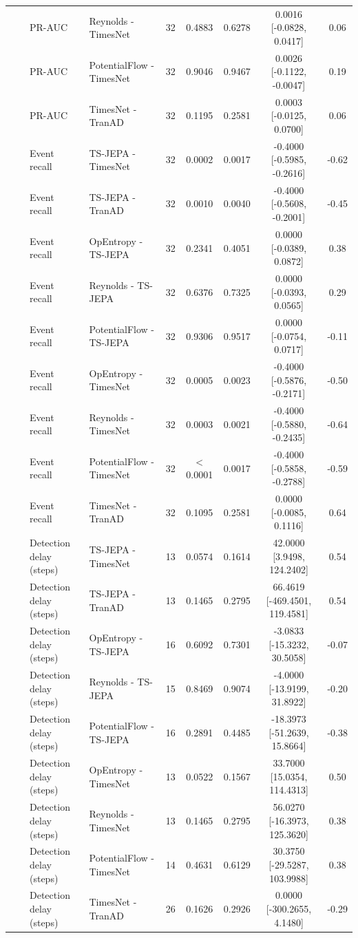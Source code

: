 {\begin{longtable}{@{}llllccccc@{}}
 &  & PR-AUC & Reynolds - TimesNet & 32 & 0.4883 & 0.6278 & 0.0016 [-0.0828, 0.0417] & 0.06 \\
 &  & PR-AUC & PotentialFlow - TimesNet & 32 & 0.9046 & 0.9467 & 0.0026 [-0.1122, -0.0047] & 0.19 \\
 &  & PR-AUC & TimesNet - TranAD & 32 & 0.1195 & 0.2581 & 0.0003 [-0.0125, 0.0700] & 0.06 \\
 &  & Event recall & TS-JEPA - TimesNet & 32 & 0.0002 & 0.0017 & -0.4000 [-0.5985, -0.2616] & -0.62 \\
 &  & Event recall & TS-JEPA - TranAD & 32 & 0.0010 & 0.0040 & -0.4000 [-0.5608, -0.2001] & -0.45 \\
 &  & Event recall & OpEntropy - TS-JEPA & 32 & 0.2341 & 0.4051 & 0.0000 [-0.0389, 0.0872] & 0.38 \\
 &  & Event recall & Reynolds - TS-JEPA & 32 & 0.6376 & 0.7325 & 0.0000 [-0.0393, 0.0565] & 0.29 \\
 &  & Event recall & PotentialFlow - TS-JEPA & 32 & 0.9306 & 0.9517 & 0.0000 [-0.0754, 0.0717] & -0.11 \\
 &  & Event recall & OpEntropy - TimesNet & 32 & 0.0005 & 0.0023 & -0.4000 [-0.5876, -0.2171] & -0.50 \\
 &  & Event recall & Reynolds - TimesNet & 32 & 0.0003 & 0.0021 & -0.4000 [-0.5880, -0.2435] & -0.64 \\
 &  & Event recall & PotentialFlow - TimesNet & 32 & $<$0.0001 & 0.0017 & -0.4000 [-0.5858, -0.2788] & -0.59 \\
 &  & Event recall & TimesNet - TranAD & 32 & 0.1095 & 0.2581 & 0.0000 [-0.0085, 0.1116] & 0.64 \\
 &  & Detection delay (steps) & TS-JEPA - TimesNet & 13 & 0.0574 & 0.1614 & 42.0000 [3.9498, 124.2402] & 0.54 \\
 &  & Detection delay (steps) & TS-JEPA - TranAD & 13 & 0.1465 & 0.2795 & 66.4619 [-469.4501, 119.4581] & 0.54 \\
 &  & Detection delay (steps) & OpEntropy - TS-JEPA & 16 & 0.6092 & 0.7301 & -3.0833 [-15.3232, 30.5058] & -0.07 \\
 &  & Detection delay (steps) & Reynolds - TS-JEPA & 15 & 0.8469 & 0.9074 & -4.0000 [-13.9199, 31.8922] & -0.20 \\
 &  & Detection delay (steps) & PotentialFlow - TS-JEPA & 16 & 0.2891 & 0.4485 & -18.3973 [-51.2639, 15.8664] & -0.38 \\
 &  & Detection delay (steps) & OpEntropy - TimesNet & 13 & 0.0522 & 0.1567 & 33.7000 [15.0354, 114.4313] & 0.50 \\
 &  & Detection delay (steps) & Reynolds - TimesNet & 13 & 0.1465 & 0.2795 & 56.0270 [-16.3973, 125.3620] & 0.38 \\
 &  & Detection delay (steps) & PotentialFlow - TimesNet & 14 & 0.4631 & 0.6129 & 30.3750 [-29.5287, 103.9988] & 0.38 \\
 &  & Detection delay (steps) & TimesNet - TranAD & 26 & 0.1626 & 0.2926 & 0.0000 [-300.2655, 4.1480] & -0.29 \\
\end{longtable}
}
